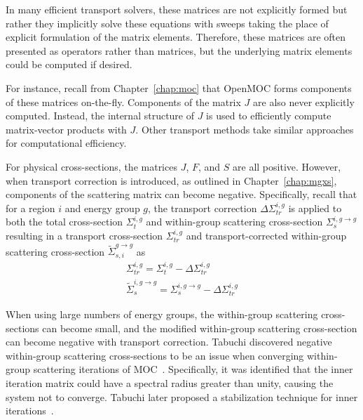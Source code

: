 In many efficient transport solvers, these matrices are not explicitly formed but rather they implicitly solve these equations with sweeps taking the place of explicit formulation of the matrix elements. Therefore, these matrices are often presented as operators rather than matrices, but the underlying matrix elements could be computed if desired. 

For instance, recall from Chapter~\ref{chap:moc} that OpenMOC forms components of these matrices on-the-fly. Components of the matrix $J$ are also never explicitly computed. Instead, the internal structure of $J$ is used to efficiently compute matrix-vector products with $J$. Other transport methods take similar approaches for computational efficiency.

For physical cross-sections, the matrices $J$, $F$, and $S$ are all positive. However, when transport correction is introduced, as outlined in Chapter~\ref{chap:mgxs}, components of the scattering matrix can become negative. Specifically, recall that for a region $i$ and energy group $g$, the transport correction $\Delta \Sigma_{\textit{tr}}^{i, g}$ is applied to both the total cross-section $\Sigma_{t}^{i, g}$ and within-group scattering cross-section $\Sigma_{s}^{i, g \rightarrow g}$ resulting in a transport cross-section $\Sigma_{\textit{tr}}^{i, g}$ and transport-corrected within-group scattering cross-section $\tilde{\Sigma}_{s, i}^{g \rightarrow g}$ as
\begin{equation}
\begin{split}
\Sigma_{\textit{tr}}^{i,g} = \Sigma_{t}^{i,g} -  \Delta \Sigma_{\textit{tr}}^{i, g} \\
\tilde{\Sigma}_{s}^{i,g \rightarrow g} = \Sigma_{s}^{i, g \rightarrow g} -  \Delta \Sigma_{\textit{tr}}^{i, g}
\end{split}
\label{eq:total-xs}
\end{equation}

When using large numbers of energy groups, the within-group scattering cross-sections can become small, and the modified within-group scattering cross-section can become negative with transport correction. Tabuchi discovered negative within-group scattering cross-sections to be an issue when converging within-group scattering iterations of \ac{MOC}~\cite{ty-problem}. Specifically, it was identified that the inner iteration matrix could have a spectral radius greater than unity, causing the system not to converge. Tabuchi later proposed a stabilization technique for inner iterations~\cite{ty-solution}.

